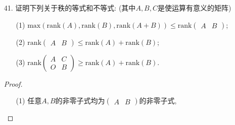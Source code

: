 \documentclass{article}
\begin{document}
\begin{enumerate}
\begin{proof}
\begin{enumerate}
                \item [(1)]$\mbox{rank}(A)=n$
                \[\mbox{rank}(A^*)=\mbox{rank}(A\cdot A^*)=\mbox{rank}(\det(A)I_n)=n.\]
                \item [(2)]$\mbox{rank}(A)=n-1$
                \[
                    \begin{cases}
                        \ A \cdot A^*=O &\Rightarrow \mbox{rank}(A^*)+\mbox{rank}(A)\leqslant n\\
                        \ &\\
                        \ \mbox{rank}(A)=n-1 &\Rightarrow \exists\ A_{ij}\neq 0 , \mbox{rank}(A^*)>0
                    \end{cases}
                    \Rightarrow
                    0< \mbox{rank}(A^*) \leqslant n-\mbox{rank}(A)=1.
                \]
                显然有\[\mbox{rank}(A^*)=1.\]
                \item [(3)]$\mbox{rank}(A)\leqslant n-2$
                \[\mbox{rank}(A) \leqslant n-2 \Rightarrow \forall\ i,j,A_{ij}={(-1)}^{i+j} M_{ij}=0\Rightarrow \mbox{rank}(A^*)=\mbox{rank}(O)=0.\]
            \end{enumerate}
        \end{proof}
        \item [41.]证明下列关于秩的等式和不等式: (其中$A,B,C$是使运算有意义的矩阵)
        \begin{enumerate}
            \item [(1)]$\mbox{max}\left( \mbox{rank}(A),\mbox{rank}(B),\mbox{rank}(A+B)\right)\leqslant \mbox{rank} \begin{pmatrix} A & B\end{pmatrix}$;
            \item [(2)]$\mbox{rank} \begin{pmatrix} A & B\end{pmatrix}\leqslant \mbox{rank} (A) +\mbox{rank} (B)$;
            \item [(3)]$\mbox{rank} \begin{pmatrix} A & C\\ O & B\end{pmatrix}\geqslant \mbox{rank}(A)+\mbox{rank} (B)$.
        \end{enumerate}
        \begin{proof}
            \begin{enumerate}
                \item []
                \item [(1)]任意$A,B$的非零子式均为$\begin{pmatrix} A & B\end{pmatrix}$的非零子式,

\end{enumerate}
\end{proof}
\end{enumerate}
\end{document}
